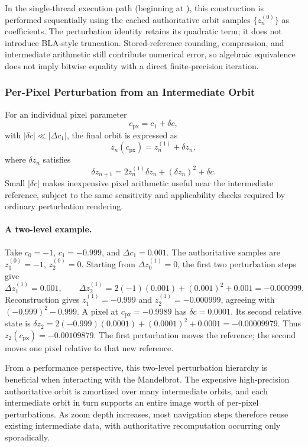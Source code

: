In the single-thread execution path (beginning at
), this construction is performed
sequentially using the cached authoritative
orbit samples $\{z^{(0)}_n\}$ as coefficients.
The perturbation identity retains its quadratic term; it does not introduce
BLA-style truncation.  Stored-reference rounding, compression, and intermediate
arithmetic still contribute numerical error, so algebraic equivalence does
not imply bitwise equality with a direct finite-precision iteration.

\subsubsection{Per-Pixel Perturbation from an Intermediate Orbit}

For an individual pixel parameter
\[
c_{\text{px}} = c_1 + \delta c,
\]
with $|\delta c| \ll |\Delta c_1|$, the final orbit is expressed as
\[
z_n(c_{\text{px}}) = z^{(1)}_n + \delta z_n,
\]
where $\delta z_n$ satisfies
\begin{equation}
\delta z_{n+1}
= 2 z^{(1)}_n \delta z_n
  + (\delta z_n)^2
  + \delta c.
\label{eq:pixel_perturbation}
\end{equation}
Small $|\delta c|$ makes inexpensive pixel arithmetic useful near the
intermediate reference, subject to the same sensitivity and applicability
checks required by ordinary perturbation rendering.

\paragraph{A two-level example.}
Take $c_0=-1$, $c_1=-0.999$, and $\Delta c_1=0.001$.  The authoritative
samples are $z^{(0)}_1=-1$, $z^{(0)}_2=0$.  Starting from
$\Delta z^{(1)}_0=0$, the first two perturbation steps give
\[
\Delta z^{(1)}_1=0.001,\qquad
\Delta z^{(1)}_2=2(-1)(0.001)+(0.001)^2+0.001=-0.000999.
\]
Reconstruction gives $z^{(1)}_1=-0.999$ and $z^{(1)}_2=-0.000999$,
agreeing with $(-0.999)^2-0.999$.  A pixel at
$c_{\text{px}}=-0.9989$ has $\delta c=0.0001$.  Its second relative state is
$\delta z_2=2(-0.999)(0.0001)+(0.0001)^2+0.0001=-0.00009979$.
Thus $z_2(c_{\text{px}})=-0.00109879$.  The first perturbation moves the
reference; the second moves one pixel relative to that new reference.

From a performance perspective, this two-level perturbation hierarchy is
beneficial when interacting with the Mandelbrot. The expensive high-precision
authoritative orbit is amortized over many intermediate orbits, and each
intermediate orbit in turn supports an entire image worth of per-pixel
perturbations. As zoom depth increases, most navigation steps therefore reuse
existing intermediate data, with authoritative recomputation occurring only
sporadically.


